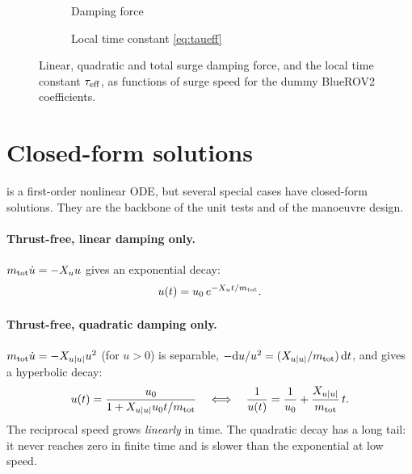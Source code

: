 \begin{figure}[htbp]
\centering
\begin{subfigure}{0.48\textwidth}
\centering
{}
\caption{Damping force}
\end{subfigure}\hfill
\begin{subfigure}{0.48\textwidth}
\centering
{}
\caption{Local time constant \eqref{eq:taueff}}
\end{subfigure}
\caption{Linear, quadratic and total surge damping force, and the local time constant
$\tau_\mathrm{eff}$, as functions of surge speed for the dummy BlueROV2 coefficients.}
\label{fig:drag}
\end{figure}
\FloatBarrier

\section{Closed-form solutions}
\label{sec:closedform}

 is a first-order nonlinear ODE, but several special cases have closed-form
solutions. They are the backbone of the unit tests and of the manoeuvre design.

\paragraph{Thrust-free, linear damping only.} $m_\mathrm{tot}\dot u = -X_u u$ gives an exponential decay:
\begin{equation}
  u(t) = u_0\,e^{-X_u t/m_\mathrm{tot}}.
  \label{eq:decay-lin}
\end{equation}

\paragraph{Thrust-free, quadratic damping only.} $m_\mathrm{tot}\dot u = -X_{u|u|} u^2$ (for $u>0$) is
separable, $-\mathrm{d}u/u^2 = (X_{u|u|}/m_\mathrm{tot})\,\mathrm{d}t$, and gives a hyperbolic decay:
\begin{equation}
  u(t) = \frac{u_0}{1 + X_{u|u|} u_0 t/m_\mathrm{tot}}
  \quad\Longleftrightarrow\quad
  \frac{1}{u(t)} = \frac{1}{u_0} + \frac{X_{u|u|}}{m_\mathrm{tot}}\,t .
  \label{eq:decay-quad}
\end{equation}
The reciprocal speed grows \emph{linearly} in time. The quadratic decay has a long tail: it
never reaches zero in finite time and is slower than the exponential at low speed.

